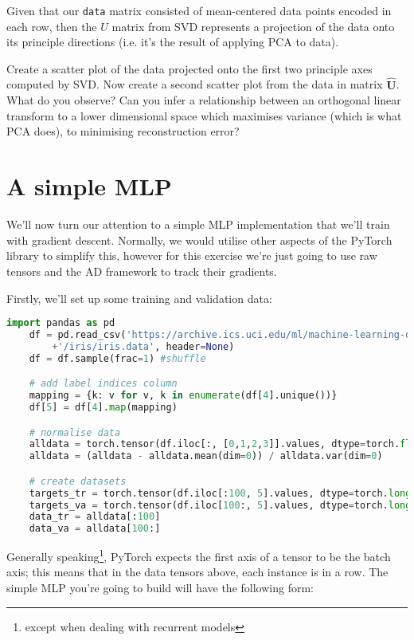 \documentclass[a4paper]{article}
\begin{document}
\begin{tcolorbox}[title=1.3 Compare against PCA (1 mark)]
Given that our \texttt{data} matrix consisted of mean-centered data points encoded in each row, then the $U$ matrix from SVD represents a projection of the data onto its principle directions (i.e. it's the result of applying PCA to data).

Create a scatter plot of the data projected onto the first two principle axes computed by SVD. Now create a second scatter plot from the data in matrix $\hat{\bm U}$. What do you observe? Can you infer a relationship between an orthogonal linear transform to a lower dimensional space which maximises variance (which is what PCA does), to minimising reconstruction error?
\end{tcolorbox}

\section{A simple MLP}\label{mlp}
We'll now turn our attention to a simple MLP implementation that we'll train with gradient descent. Normally, we would utilise other aspects of the PyTorch library to simplify this, however for this exercise we're just going to use raw tensors and the AD framework to track their gradients.

Firstly, we'll set up some training and validation data:
\begin{lstlisting}[language=Python]
	import pandas as pd
	df = pd.read_csv('https://archive.ics.uci.edu/ml/machine-learning-databases'
		+'/iris/iris.data', header=None)
	df = df.sample(frac=1) #shuffle

	# add label indices column
	mapping = {k: v for v, k in enumerate(df[4].unique())}  
	df[5] = df[4].map(mapping)

	# normalise data
	alldata = torch.tensor(df.iloc[:, [0,1,2,3]].values, dtype=torch.float)
	alldata = (alldata - alldata.mean(dim=0)) / alldata.var(dim=0)

	# create datasets
	targets_tr = torch.tensor(df.iloc[:100, 5].values, dtype=torch.long)
	targets_va = torch.tensor(df.iloc[100:, 5].values, dtype=torch.long)
	data_tr = alldata[:100]
	data_va = alldata[100:]
\end{lstlisting}

Generally speaking\footnote{except when dealing with recurrent models}, PyTorch expects the first axis of a tensor to be the batch axis; this means that in the data tensors above, each instance is in a row. The simple MLP you're going to build will have the following form:
\end{document}
